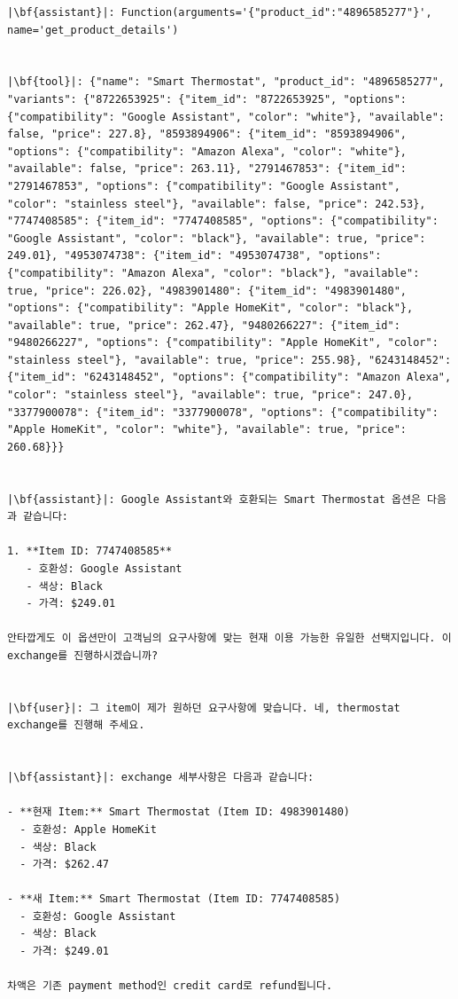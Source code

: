 \begin{longlisting}
\begin{verbatim}
|\bf{assistant}|: Function(arguments='{"product_id":"4896585277"}', name='get_product_details')


|\bf{tool}|: {"name": "Smart Thermostat", "product_id": "4896585277", "variants": {"8722653925": {"item_id": "8722653925", "options": {"compatibility": "Google Assistant", "color": "white"}, "available": false, "price": 227.8}, "8593894906": {"item_id": "8593894906", "options": {"compatibility": "Amazon Alexa", "color": "white"}, "available": false, "price": 263.11}, "2791467853": {"item_id": "2791467853", "options": {"compatibility": "Google Assistant", "color": "stainless steel"}, "available": false, "price": 242.53}, "7747408585": {"item_id": "7747408585", "options": {"compatibility": "Google Assistant", "color": "black"}, "available": true, "price": 249.01}, "4953074738": {"item_id": "4953074738", "options": {"compatibility": "Amazon Alexa", "color": "black"}, "available": true, "price": 226.02}, "4983901480": {"item_id": "4983901480", "options": {"compatibility": "Apple HomeKit", "color": "black"}, "available": true, "price": 262.47}, "9480266227": {"item_id": "9480266227", "options": {"compatibility": "Apple HomeKit", "color": "stainless steel"}, "available": true, "price": 255.98}, "6243148452": {"item_id": "6243148452", "options": {"compatibility": "Amazon Alexa", "color": "stainless steel"}, "available": true, "price": 247.0}, "3377900078": {"item_id": "3377900078", "options": {"compatibility": "Apple HomeKit", "color": "white"}, "available": true, "price": 260.68}}}


|\bf{assistant}|: Google Assistant와 호환되는 Smart Thermostat 옵션은 다음과 같습니다:

1. **Item ID: 7747408585**
   - 호환성: Google Assistant
   - 색상: Black
   - 가격: $249.01

안타깝게도 이 옵션만이 고객님의 요구사항에 맞는 현재 이용 가능한 유일한 선택지입니다. 이 exchange를 진행하시겠습니까?


|\bf{user}|: 그 item이 제가 원하던 요구사항에 맞습니다. 네, thermostat exchange를 진행해 주세요.


|\bf{assistant}|: exchange 세부사항은 다음과 같습니다:

- **현재 Item:** Smart Thermostat (Item ID: 4983901480)
  - 호환성: Apple HomeKit
  - 색상: Black
  - 가격: $262.47

- **새 Item:** Smart Thermostat (Item ID: 7747408585)
  - 호환성: Google Assistant
  - 색상: Black
  - 가격: $249.01

차액은 기존 payment method인 credit card로 refund됩니다.


\end{verbatim}
\end{longlisting}
